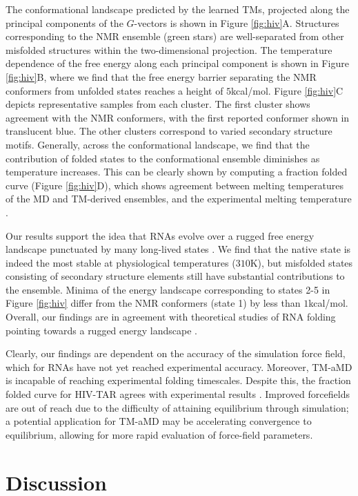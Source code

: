 \documentclass[9pt,twocolumn,twoside]{pnas-new}
\begin{document}
{The conformational landscape predicted by the learned TMs, projected along the principal components of the $G$-vectors is shown in Figure \ref{fig:hiv}A. Structures corresponding to the NMR ensemble (green stars) are well-separated from other misfolded structures within the two-dimensional projection. The temperature dependence of the free energy along each principal component is shown in Figure \ref{fig:hiv}B, where we find that the free energy barrier separating the NMR conformers from unfolded states reaches a height of $5$kcal/mol. Figure \ref{fig:hiv}C depicts representative samples from each cluster.  The first cluster shows agreement with the NMR conformers, with the first reported conformer shown in translucent blue. The other clusters correspond to varied secondary structure motifs. Generally, across the conformational landscape, we find that the contribution of folded states to the conformational ensemble diminishes as temperature increases. This can be clearly shown by computing a fraction folded curve (Figure \ref{fig:hiv}D), which shows agreement between melting temperatures of the MD and TM-derived ensembles, and the experimental melting temperature \cite{hiv-experiment}.

Our results support the idea that RNAs evolve over a rugged free energy landscape punctuated by many long-lived states \cite{dill-chen}. We find that the native state is indeed the most stable at physiological temperatures ($310$K), but misfolded states consisting of secondary structure elements still have substantial contributions to the ensemble. Minima of the energy landscape corresponding to states 2-5 in Figure \ref{fig:hiv} differ from the NMR conformers (state 1) by less than $1$kcal/mol. Overall, our findings are in agreement with theoretical studies of RNA folding pointing towards a rugged energy landscape \cite{dill-chen,wales-RNA}.

Clearly, our findings are dependent on the accuracy of the simulation force field, which for RNAs have not yet reached experimental accuracy. Moreover, TM-aMD is incapable of reaching experimental folding timescales. Despite this, the fraction folded curve for HIV-TAR agrees with experimental results \cite{hiv-experiment}. Improved forcefields are out of reach due to the difficulty of attaining equilibrium through simulation; a potential application for TM-aMD may be accelerating convergence to equilibrium, allowing for more rapid evaluation of force-field parameters.

\section{Discussion}

}
\end{document}
